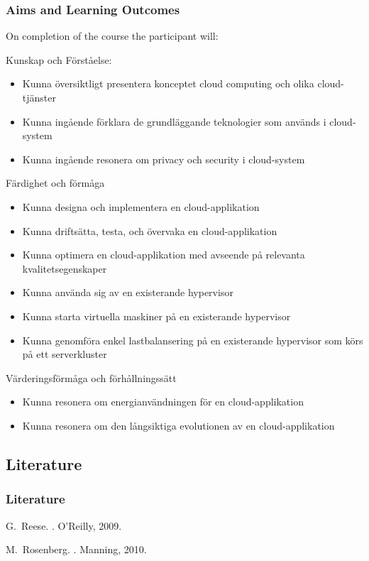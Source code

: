 \documentclass[10pt]{beamer}
\begin{document}
\begin{frame}[t]
\frametitle{Aims and Learning Outcomes}
On completion of the course the participant will: 

\begin{scriptsize}
Kunskap och Förståelse:
\begin{itemize}
\item Kunna översiktligt presentera konceptet cloud computing och olika cloud-tjänster
\item Kunna ingående förklara de grundläggande teknologier som används i cloud-system
\item Kunna ingående resonera om privacy och security i cloud-system
\end{itemize}

Färdighet och förmåga
\begin{itemize}
\item Kunna designa och implementera en cloud-applikation
\item Kunna driftsätta, testa, och övervaka en cloud-applikation
\item Kunna optimera en cloud-applikation med avseende på relevanta kvalitetsegenskaper
\item Kunna använda sig av en existerande hypervisor
\item Kunna starta virtuella maskiner på en existerande hypervisor
\item Kunna genomföra enkel lastbalansering på en existerande hypervisor som körs på ett serverkluster
\end{itemize}

Värderingsförmåga och förhållningssätt
\begin{itemize}
\item Kunna resonera om energianvändningen för en cloud-applikation
\item Kunna resonera om den långsiktiga evolutionen av en cloud-applikation
\end{itemize}
\end{scriptsize}

\end{frame}


\subsection{Literature}

\begin{frame}[t]
\frametitle{Literature}

\begin{thebibliography}{10}
  
\beamertemplatebookbibitems

  G.~Reese.
   .
   \newblock O'Reilly, 2009.

  M.~Rosenberg.
  .
  \newblock Manning, 2010.
\end{thebibliography}
\end{frame}
\end{document}
